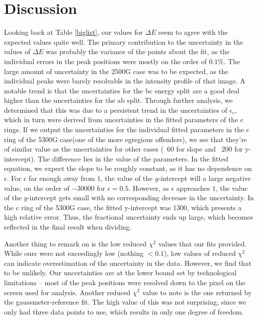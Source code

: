 \documentclass{amsart}
\begin{document}
\section{Discussion}
Looking back at Table \ref{biglist}, our values for $\Delta E$ seem to agree with the expected values quite well. The primary contribution to the uncertainty in the values of $\Delta E$ was probably the variance of the points about the fit, as the individual errors in the peak positions were mostly on the order of $0.1\%$. The large amount of uncertainty in the 2500G case was to be expected, as the individual peaks were barely resolvable in the intensity profile of that image. A notable trend is that the uncertainties for the bc energy split are a good deal higher than the uncertainties for the ab split. Through further analysis, we determined that this was due to a persistent trend in the uncertainties of $\epsilon_c$, which in turn were derived from uncertainties in the fitted parameters of the c rings. If we output the uncertainties for the individual fitted parameters in the c ring of the 5300G case(one of the more egregious offenders), we see that they're of similar value as the uncertainties for other cases (~60 for slope and ~200 for y-intercept). The difference lies in the value of the parameters. In the fitted equation, we expect the slope to be roughly constant, as it has no dependence on $\epsilon$. For $\epsilon$ far enough away from $1$, the value of the $y$-intercept will a large negative value, on the order of $-30000$ for $\epsilon=0.5$. However, as $\epsilon$ approaches $1$, the value of the $y$-intercept gets small with no corresponding decrease in the uncertainty. In the c ring of the 5300G case, the fitted y-intercept was 1300, which presents a high relative error. Thus, the fractional uncertainty ends up large, which becomes reflected in the final result when dividing. 

Another thing to remark on is the low reduced $\chi^2$ values that our fits provided. While ours were not exceedingly low (nothing $<0.1$), low values of reduced $\chi^2$ can indicate overestimation of the uncertainty in the data. However, we find that to be unlikely. Our uncertainties are at the lower bound set by technological limitations -- most of the peak positions were resolved down to the pixel on the screen used for analysis. Another reduced $\chi^2$ value to note is the one returned by the gaussmeter-reference fit. The high value of this was not surprising, since we only had three data points to use, which results in only one degree of freedom.
\end{document}
